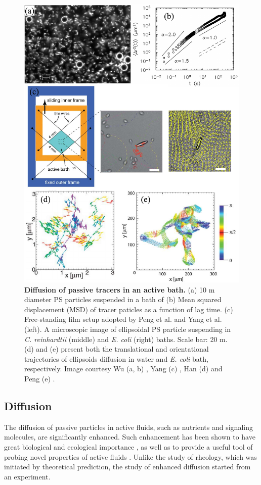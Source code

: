\begin{figure}[!htbp]
	\begin{center}
	\includegraphics[height=5.5 in]{Figs/1-Intro/3.pdf}
	\end{center}
	\caption[Figure 1.3:]
	{
	\textbf{Diffusion of passive tracers in an active bath.}
	(a) 10 \textmu m diameter PS particles suspended in a bath of 
	(b) Mean squared displacement (MSD) of tracer paticles as a function of lag time.
	(c) Free-standing film setup adopted by Peng et al. and Yang et al. (left)\cite{Peng2016, Yang2016}. A microscopic image of ellipsoidal PS particle suspending in \textit{C. reinhardtii} (middle) and \textit{E. coli} (right) baths. Scale bar: 20 \textmu m.
	(d) and (e) present both the translational and orientational trajectories of ellipsoids diffusion in water and \textit{E. coli} bath, respectively.
	Image courtesy Wu (a, b) \cite{Wu2000}, Yang (c) \cite{Yang2016}, Han (d) \cite{Han2006} and Peng (e) \cite{Peng2016}.
	}
	\label{fig:diffusion-in-active-fluids}
\end{figure}

\subsection{Diffusion}
\label{sec:diffusion}
The diffusion of passive particles in active fluids, such as nutrients and signaling molecules, are significantly enhanced. Such enhancement has been shown to have great biological and ecological importance \cite{Wu2000, Kurtuldu2011, Morozov2014}, as well as to provide a useful tool of probing novel properties of active fluids \cite{Squires2010}. Unlike the study of rheology, which was initiated by theoretical prediction, the study of enhanced diffusion started from an experiment.

